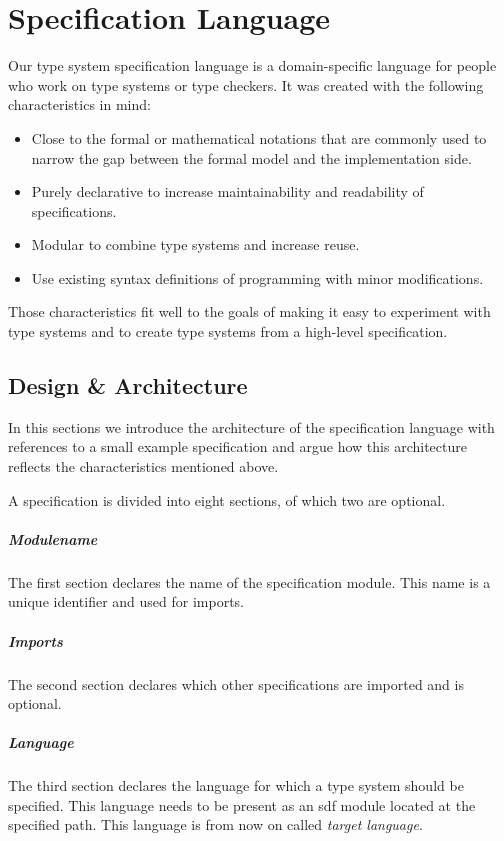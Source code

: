 \chapter{Specification Language}
Our type system specification language is a domain-specific language
for people who work on type systems or type checkers. It was created
with the following characteristics in mind:

\begin{itemize}
\item Close to the formal or mathematical notations that are commonly
  used to narrow the gap between the formal model and the
  implementation side.
\item Purely declarative to increase maintainability and readability of
  specifications.
\item Modular to combine type systems and increase reuse.
\item Use existing syntax definitions of programming with minor
  modifications.
\end{itemize}

Those characteristics fit well to the goals of making it easy to
experiment with type systems and to create type systems from a
high-level specification.
\section{Design \& Architecture}
In this sections we introduce the architecture of the specification
language with references to a small example specification and argue
how this architecture reflects the characteristics mentioned above.

A specification is divided into eight sections, of which two are
optional.

\paragraph{Modulename} The first section declares the name of the
specification module. This name is a unique identifier and used for
imports.

\paragraph{Imports} The second section declares which other
specifications are imported and is optional.

\paragraph{Language} The third section declares the language for which
a type system should be specified. This language needs to be present
as an \gls{sdf} module located at the specified path. This language is
from now on called \textit{target language}.

